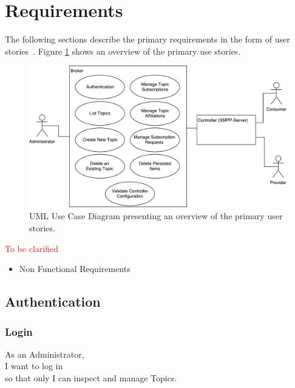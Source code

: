 
\section{Requirements}\label{sec:requirements}

The following sections describe the primary requirements in the form of user stories~\cite{agile-alliance-user-stories}.
Figure \ref{fig:requirements-overview} shows an overview of the primary use stories.

\begin{figure}[h]
    \centering
    \includegraphics[width=1\linewidth]{resources/requirements_overview}
    \caption{UML Use Case Diagram presenting an overview of the primary user stories.}
    \label{fig:requirements-overview}
\end{figure}

\noindent\textcolor{red}{To be clarified}

\begin{itemize}
    \item Non Functional Requirements
\end{itemize}


\subsection{Authentication}
\subsubsection{Login}

As an Administrator,\\
I want to log in\\
so that only I can inspect and manage Topics.\\

